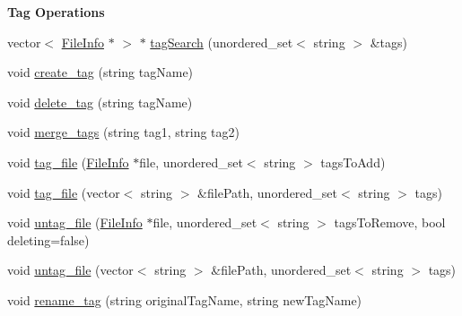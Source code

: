 \begin{Indent}\textbf{ Tag Operations}\par
\begin{DoxyCompactItemize}
\item 
vector$<$ \mbox{\hyperlink{classFileInfo}{File\+Info}} $\ast$ $>$ $\ast$ \mbox{\hyperlink{classFileSystem_afa5afeedec00348c8d1ab922dac9b086}{tag\+Search}} (unordered\+\_\+set$<$ string $>$ \&tags)
\item 
void \mbox{\hyperlink{classFileSystem_a678d743f3dc5b86c0b0c568795ec6a29}{create\+\_\+tag}} (string tag\+Name)
\item 
void \mbox{\hyperlink{classFileSystem_a7c1842bbdfc9bb43c848b21886dac602}{delete\+\_\+tag}} (string tag\+Name)
\item 
void \mbox{\hyperlink{classFileSystem_a639cbe0f8e5be5793cc20594c493a2c8}{merge\+\_\+tags}} (string tag1, string tag2)
\item 
void \mbox{\hyperlink{classFileSystem_a33649a9100b30978db80654ece6504f4}{tag\+\_\+file}} (\mbox{\hyperlink{classFileInfo}{File\+Info}} $\ast$file, unordered\+\_\+set$<$ string $>$ tags\+To\+Add)
\item 
void \mbox{\hyperlink{classFileSystem_a7d761ee2fa4d0c2965b5d3c7a75e7fdc}{tag\+\_\+file}} (vector$<$ string $>$ \&file\+Path, unordered\+\_\+set$<$ string $>$ tags)
\item 
void \mbox{\hyperlink{classFileSystem_ac41a4071cfd0f4470f606e24c04740b7}{untag\+\_\+file}} (\mbox{\hyperlink{classFileInfo}{File\+Info}} $\ast$file, unordered\+\_\+set$<$ string $>$ tags\+To\+Remove, bool deleting=false)
\item 
void \mbox{\hyperlink{classFileSystem_a0389071e782ad9972fbf599179d44c3e}{untag\+\_\+file}} (vector$<$ string $>$ \&file\+Path, unordered\+\_\+set$<$ string $>$ tags)
\item 
void \mbox{\hyperlink{classFileSystem_aaaecc65bbba05c3ede2e6246915e35d1}{rename\+\_\+tag}} (string original\+Tag\+Name, string new\+Tag\+Name)
\end{DoxyCompactItemize}
\end{Indent}
